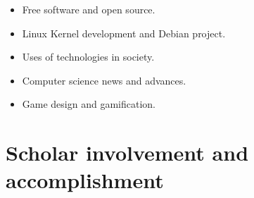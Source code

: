 \documentclass{res}
\newcommand{\inFrench}[1]{}
\newcommand{\inEnglish}[1]{#1}
\begin{document}
\begin{resume}
\inEnglish{
	\vspace{6pt}
	\begin{itemize} \itemsep -2pt
		\item Free software and open source.
		\item Linux Kernel development and Debian project.
		\item Uses of technologies in society.
		\item Computer science news and advances.
		\item Game design and gamification.
	\end{itemize}
}

\inFrench{
	\section{Implication scolaire et accomplissements}
}
\inEnglish{
	\section{Scholar involvement and accomplishment}
}
\vspace{6pt}

\inFrench{
	{\sl Membre du club Formule ÉTS} \hfill (Club étudiant)
	\vspace{0.05in}
	\begin{itemize} \itemsep -2pt
		\item Création d’un document de vision ainsi qu’un document de spécification des requis pour une application de télémétrie en temps réel;
		\item Prototypage d'une application de télémétrie en temps-réel en JavaScript.
	\end{itemize}

	{\sl Membre du club Conjure} \hfill (Club étudiant)
	\vspace{0.05in}
	\begin{itemize} \itemsep -2pt
		\item Création d’un jeu en C\# avec le logiciel Unity;
		\item Gestion du projet.
	\end{itemize}

	{\sl Promotion du programme collégial} \hfill (Cégep)
	\vspace{0.05in}
	\begin{itemize} \itemsep -2pt
		\item Entrevue avec le journal régional pour la promotion du programme collégial;
		\item Participation aux portes ouvertes pour la présentation des projets accomplis durant mon parcours.
	\end{itemize}

}
\end{resume}
\end{document}
